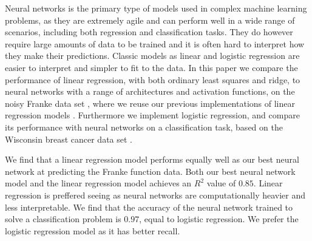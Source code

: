 Neural networks is the primary type of models used in complex machine learning problems, as they are extremely agile and can perform well in a wide range of scenarios, including both regression and classification tasks.
They do however require large amounts of data to be trained and it is often hard to interpret how they make their predictions.
Classic models as linear and logistic regression are easier to interpret and simpler to fit to the data.
In this paper we compare the performance of linear regression, with both ordinary least squares and ridge, to neural networks with a range of architectures and activation functions, on the noisy Franke data set \cite{frank}, where we reuse our previous implementations of linear regression models \cite{project1}.
Furthermore we implement logistic regression, and compare its performance with neural networks on a classification task, based on the Wisconsin breast cancer data set \cite{breast_cancer_wisconsin}.

We find that a linear regression model performs equally well as our best neural network at predicting the Franke function data. 
Both our best neural network model and the linear regression model achieves an $R^2$ value of $0.85$. Linear regression is preffered seeing as neural networks are computationally heavier and less interpretable.
We find that the accuracy of the neural network trained to solve a classification problem is $0.97$, equal to logistic regression. We prefer the logistic regression model as it has better recall.



